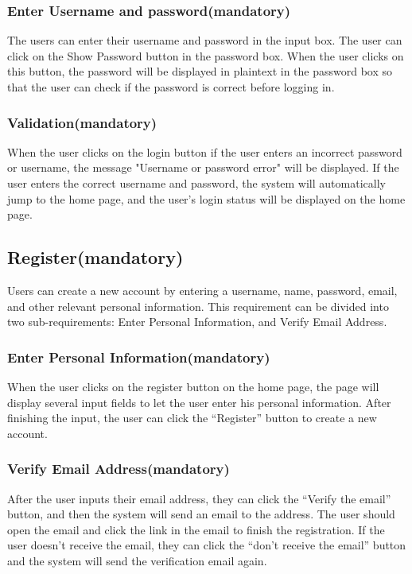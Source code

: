 \documentclass[conference]{IEEEtran}
\begin{document}
\subsubsection{ Enter Username and password(mandatory)}

The users can enter their username and password in the input box. The 
user can click on the Show Password button in the password box. When the user 
clicks on this button, the password will be displayed in plaintext in the password 
box so that the user can check if the password is correct before logging in.

\subsubsection{ Validation(mandatory) }

When the user clicks on the login button if the user enters an incorrect 
password or username, the message "Username or password error" will be 
displayed. If the user enters the correct username and password, the system 
will automatically jump to the home page, and the user's login status will be 
displayed on the home page.


\subsection{  Register(mandatory)}

Users can create a new account by entering a username, name, password, email,
and other relevant personal information. This requirement can be divided into 
two sub-requirements: Enter Personal Information, and Verify Email Address.

\subsubsection{ Enter Personal Information(mandatory)}

When the user clicks on the register button on the home page, the page will display several 
input fields to let the user enter his personal information. After finishing the 
input, the user can click the “Register” button to create a new account.

\subsubsection{ Verify Email Address(mandatory) }

After the user inputs their email address, they can click the “Verify the 
email” button, and then the system will send an email to the address. The user
should open the email and click the link in the email to finish the registration. If 
the user doesn't receive the email, they can click the “don’t receive the email” 
button and the system will send the verification email again.
\end{document}
